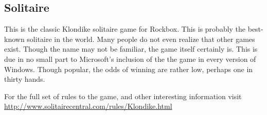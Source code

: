 \subsection{Solitaire}

This is the classic Klondike solitaire game for Rockbox.
This is probably the best-known solitaire in the world. Many people 
do not even realize that other games exist. Though the name may not 
be familiar, the game itself certainly is. This is due in no small 
part to Microsoft's inclusion of the the game in every version of 
Windows. Though popular, the odds of winning are rather low, perhaps 
one in thirty hands.

For the full set of rules to the game, and other interesting information
visit
\url{http://www.solitairecentral.com/rules/Klondike.html}

